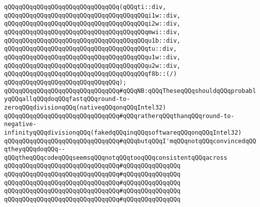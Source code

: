 \verb|qQQqqQQqqQQqqQQqqQQqqQQqqQQqqQQq(qQQqti::div,|\newline
\verb|qQQqqQQqqQQqqQQqqQQqqQQqqQQqqQQqqQQqqQQqi1w::div,|\newline
\verb|qQQqqQQqqQQqqQQqqQQqqQQqqQQqqQQqqQQqqQQqi2w::div,|\newline
\verb|qQQqqQQqqQQqqQQqqQQqqQQqqQQqqQQqqQQqqQQqmwi::div,|\newline
\verb|qQQqqQQqqQQqqQQqqQQqqQQqqQQqqQQqqQQqqQQqu1b::div,|\newline
\verb|qQQqqQQqqQQqqQQqqQQqqQQqqQQqqQQqqQQqqQQqtu::div,|\newline
\verb|qQQqqQQqqQQqqQQqqQQqqQQqqQQqqQQqqQQqqQQqu1w::div,|\newline
\verb|qQQqqQQqqQQqqQQqqQQqqQQqqQQqqQQqqQQqqQQqu2w::div,|\newline
\verb|qQQqqQQqqQQqqQQqqQQqqQQqqQQqqQQqqQQqqQQqf8b::(/)|\newline
\verb|qQQqqQQqqQQqqQQqqQQqqQQqqQQqqQQq);|\newline
\verb|qQQqqQQqqQQqqQQqqQQqqQQqqQQqqQQq#qQQqNB:qQQqTheseqQQqshouldqQQqprobablyqQQqallqQQqdoqQQqfastqQQqround-to-zeroqQQqdivisionqQQq(nativeqQQqonqQQqIntel32)|\newline
\verb|qQQqqQQqqQQqqQQqqQQqqQQqqQQqqQQq#qQQqratherqQQqthanqQQqround-to-negative-infinityqQQqdivisionqQQq(fakedqQQqinqQQqsoftwareqQQqonqQQqIntel32)|\newline
\verb|qQQqqQQqqQQqqQQqqQQqqQQqqQQqqQQq#qQQqbutqQQqI'mqQQqnotqQQqconvincedqQQqtheyqQQqdoqQQq--qQQqtheqQQqcodeqQQqseemsqQQqnotqQQqtooqQQqconsistentqQQqacross|\newline
\verb|qQQqqQQqqQQqqQQqqQQqqQQqqQQqqQQq#qQQqqQQqqQQqqQQq|\newline
\verb|qQQqqQQqqQQqqQQqqQQqqQQqqQQqqQQq#qQQqqQQqqQQqqQQq|\newline
\verb|qQQqqQQqqQQqqQQqqQQqqQQqqQQqqQQq#qQQqqQQqqQQqqQQq|\newline
\verb|qQQqqQQqqQQqqQQqqQQqqQQqqQQqqQQq#qQQqqQQqqQQqqQQq|\newline
\verb|qQQqqQQqqQQqqQQqqQQqqQQqqQQqqQQq#qQQqqQQqqQQqqQQq|\newline
